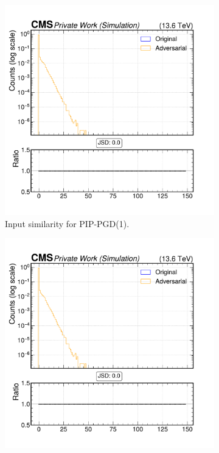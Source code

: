 \begin{figure}[htbp]
  \centering
  \begin{subfigure}[t]{0.32\textwidth}
    \includegraphics[width=\linewidth]{media/output/features/compare/combined_it_1/cmp_vtx_arr_sv_chi2.pdf}
    \caption*{Input similarity for PIP-PGD(1).}
  \end{subfigure}\hfill
  \begin{subfigure}[t]{0.32\textwidth}
    \includegraphics[width=\linewidth]{media/output/features/compare/combined_it_2/cmp_vtx_arr_sv_chi2.pdf}

\end{subfigure}
\end{figure}
